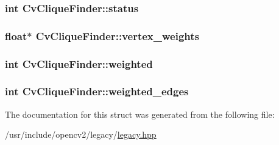 \hypertarget{structCvCliqueFinder_a4d7b6d97430bc4d1cbe3d5a6f76847dc}{
\subsubsection[{status}]{\setlength{\rightskip}{0pt plus 5cm}int Cv\-Clique\-Finder\-::status}}\label{structCvCliqueFinder_a4d7b6d97430bc4d1cbe3d5a6f76847dc}
\hypertarget{structCvCliqueFinder_a41aef4f7431fa184acd9b0f60bf1a396}{
\subsubsection[{vertex\-\_\-weights}]{\setlength{\rightskip}{0pt plus 5cm}float$\ast$ Cv\-Clique\-Finder\-::vertex\-\_\-weights}}\label{structCvCliqueFinder_a41aef4f7431fa184acd9b0f60bf1a396}
\hypertarget{structCvCliqueFinder_ae93626c5759941f929340fe879380c04}{
\subsubsection[{weighted}]{\setlength{\rightskip}{0pt plus 5cm}int Cv\-Clique\-Finder\-::weighted}}\label{structCvCliqueFinder_ae93626c5759941f929340fe879380c04}
\hypertarget{structCvCliqueFinder_a0201060ff64dd9aeb610c64ac27abafe}{
\subsubsection[{weighted\-\_\-edges}]{\setlength{\rightskip}{0pt plus 5cm}int Cv\-Clique\-Finder\-::weighted\-\_\-edges}}\label{structCvCliqueFinder_a0201060ff64dd9aeb610c64ac27abafe}


The documentation for this struct was generated from the following file\-:\begin{DoxyCompactItemize}
\item 
/usr/include/opencv2/legacy/\hyperlink{legacy_8hpp}{legacy.\-hpp}\end{DoxyCompactItemize}
